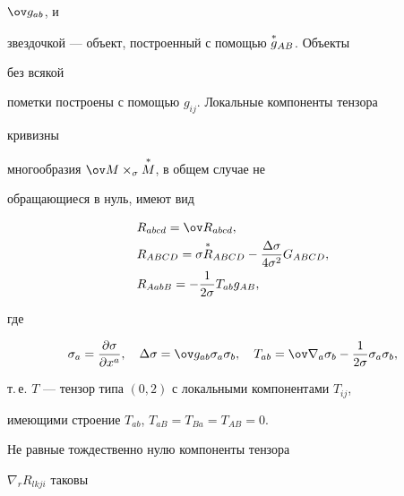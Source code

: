 $\ov g_{ab}$, и


звездочкой --- объект, построенный с помощью $\overset{*}{g}{}_{AB}$. Объекты


без всякой


пометки построены с помощью $g_{ij}$. Локальные компоненты тензора


кривизны


многообразия $\ov M\times_\sigma\up{*}{M}$, в общем случае не


обращающиеся в нуль, имеют вид


\begin{align*}


& R_{abcd}=\ov R_{abcd}, \\


& R_{ABCD}=\sigma\up{*}{R}_{ABCD}


-\frac{\Delta\sigma}{4\sigma^2}G_{ABCD}, \\


& R_{AabB}=-\frac{1}{2\sigma}T_{ab}g_{AB},


\end{align*}


где


$$


\sigma_a=\frac{\partial\sigma}{\partial x^a},\quad


\Delta\sigma=\ov g_{ab}\sigma_a\sigma_b,\quad


T_{ab}=\ov\nabla_a\sigma_b-\frac{1}{2\sigma}\sigma_a\sigma_b,


$$


т.\,е. $T$ --- тензор типа $(0,2)$ с локальными компонентами $T_{ij}$,


имеющими строение $T_{ab}$, $T_{aB}=T_{Ba}=T_{AB}=0$.





Не равные тождественно нулю компоненты тензора


$\nabla_r R_{lkji}$ таковы


